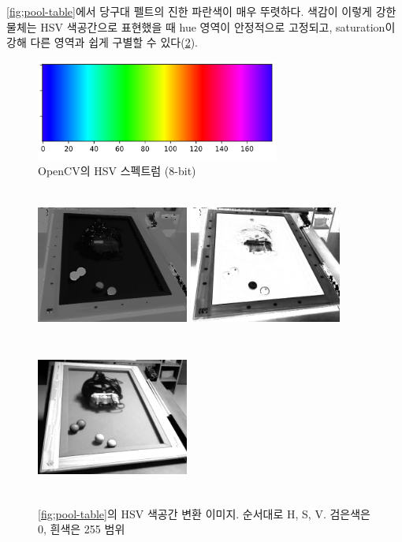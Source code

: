 \documentclass[10pt]{oblivoir}
\begin{document}
\cref{fig;pool-table}에서 당구대 펠트의 진한 파란색이 매우 뚜렷하다. 색감이 이렇게 강한 물체는 HSV 색공간으로 표현했을 때  hue 영역이 안정적으로 고정되고, saturation이 강해 다른 영역과 쉽게 구별할 수 있다(\cref{fig;pool-table-hs}).

\begin{figure}[ht]
    \centering
    \includegraphics[width=8cm]{img/hsv-spectrum.png}
    \caption{OpenCV의 HSV 스펙트럼 (8-bit)}
    \label{fig;hsv-spectrum}
\end{figure}

\begin{figure}[ht]
    \centering
    \includegraphics[width=5cm, height=5cm, keepaspectratio]{img/billiards-table-h-shift.png}
    \includegraphics[width=5cm, height=5cm, keepaspectratio]{img/billiards-table-s.png}
    \includegraphics[width=5cm, height=5cm, keepaspectratio]{img/billiards-table-v.png}
    \caption[Caption for LOF]{\cref{fig;pool-table}의 HSV 색공간 변환 이미지. 순서대로 H\footnotemark, S, V. 검은색은 0, 흰색은 255 범위}
    \label{fig;pool-table-hs}
\end{figure}
\end{document}
